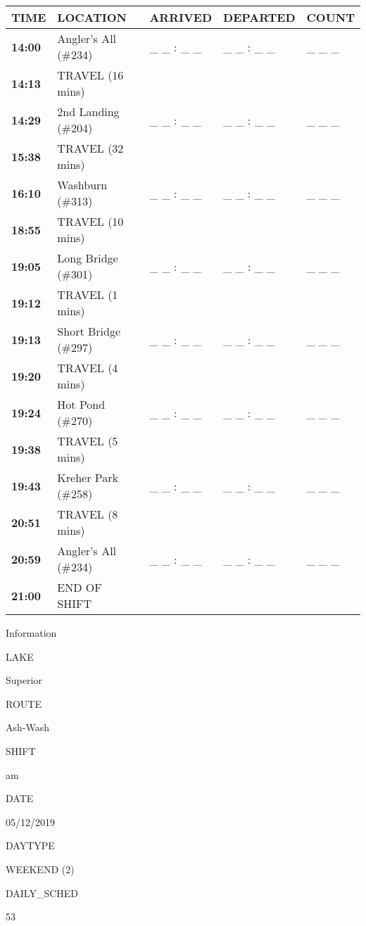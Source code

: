 \documentclass[]{article}
\begin{document}
\begin{tabular}{>{\bfseries}lllll}
\toprule
\textbf{TIME} & \textbf{LOCATION} & \textbf{ARRIVED} & \textbf{DEPARTED} & \textbf{COUNT}\\
\midrule
14:00 & Angler's All (\#234) & \_ \_ : \_ \_ & \_ \_ : \_ \_ & \_ \_ \_\\
14:13 & TRAVEL (16 mins) &  &  & \\
14:29 & 2nd Landing (\#204) & \_ \_ : \_ \_ & \_ \_ : \_ \_ & \_ \_ \_\\
15:38 & TRAVEL (32 mins) &  &  & \\
16:10 & Washburn (\#313) & \_ \_ : \_ \_ & \_ \_ : \_ \_ & \_ \_ \_\\
18:55 & TRAVEL (10 mins) &  &  & \\
19:05 & Long Bridge (\#301) & \_ \_ : \_ \_ & \_ \_ : \_ \_ & \_ \_ \_\\
19:12 & TRAVEL (1 mins) &  &  & \\
19:13 & Short Bridge (\#297) & \_ \_ : \_ \_ & \_ \_ : \_ \_ & \_ \_ \_\\
19:20 & TRAVEL (4 mins) &  &  & \\
19:24 & Hot Pond (\#270) & \_ \_ : \_ \_ & \_ \_ : \_ \_ & \_ \_ \_\\
19:38 & TRAVEL (5 mins) &  &  & \\
19:43 & Kreher Park (\#258) & \_ \_ : \_ \_ & \_ \_ : \_ \_ & \_ \_ \_\\
20:51 & TRAVEL (8 mins) &  &  & \\
20:59 & Angler's All (\#234) & \_ \_ : \_ \_ & \_ \_ : \_ \_ & \_ \_ \_\\
21:00 & END OF SHIFT &  &  & \\
\bottomrule
\end{tabular}\newpage

Information

LAKE

Superior

ROUTE

Ash-Wash

SHIFT

am

DATE

05/12/2019

DAYTYPE

WEEKEND (2)

DAILY\_SCHED

53

\vspace{24pt}
\end{document}
